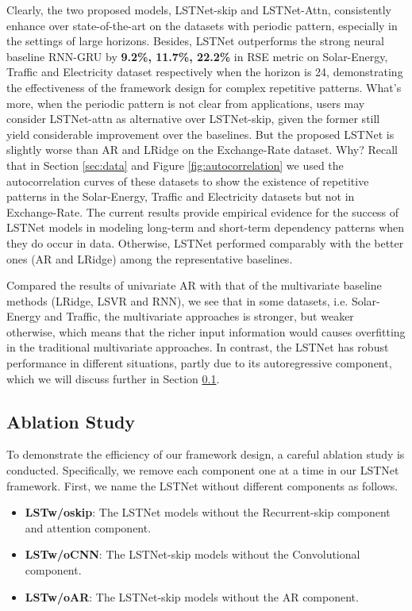 \documentclass[sigconf]{acmart}
\def\electricity{{\sf Electricity}\xspace}
\def\traffic{{\sf Traffic}\xspace}
\def\solar{{\sf Solar-Energy}\xspace}
\def\exchange{{\sf Exchange-Rate}\xspace}
\begin{document}
Clearly, the two proposed models, LSTNet-skip and LSTNet-Attn, consistently enhance over state-of-the-art on the datasets with periodic pattern, especially in the settings of large horizons. 
Besides, LSTNet outperforms the strong neural baseline RNN-GRU by \textbf{9.2\%, 11.7\%, 22.2\%} in RSE metric
on \solar, \traffic and \electricity dataset respectively when the horizon is 24,
demonstrating the effectiveness of the framework design for complex repetitive patterns. 
What's more, when the periodic pattern  is not clear from applications, users may consider LSTNet-attn as alternative over LSTNet-skip, given the former still yield considerable improvement
over the baselines. But the proposed LSTNet is slightly worse than AR and LRidge on the \exchange dataset. Why?  Recall that in Section \ref{sec:data} and Figure  \ref{fig:autocorrelation} we used the autocorrelation curves of these datasets to show the existence of  repetitive patterns in the \solar, \traffic and \electricity datasets but not in \exchange.  The current results provide empirical evidence for the success of LSTNet models in modeling long-term and short-term dependency patterns when they do occur in data.  Otherwise, LSTNet performed comparably  with the better ones (AR and LRidge) among the representative baselines.  




Compared the results of univariate AR with that of the multivariate baseline methods (LRidge, LSVR and RNN), we see that in some datasets, i.e. \solar and \traffic, the multivariate approaches is stronger, but weaker otherwise, which means that the richer input information would causes overfitting in the traditional multivariate approaches. In contrast, the LSTNet has robust performance in different situations, partly due to its  autoregressive component, which we will discuss further in Section \ref{sec:ablation}.




\subsection{Ablation Study}
\label{sec:ablation}
To demonstrate the efficiency of our framework design, a careful ablation study is conducted. Specifically, we remove each component one at a time in our LSTNet framework. First, we name the LSTNet without different components as follows.


\begin{itemize}
\item \textbf{LSTw/oskip}: The LSTNet models without the Recurrent-skip component and attention component.
\item \textbf{LSTw/oCNN}: The LSTNet-skip models without the Convolutional component.
\item \textbf{LSTw/oAR}: The LSTNet-skip models  without the AR component.
\end{itemize}
\end{document}

